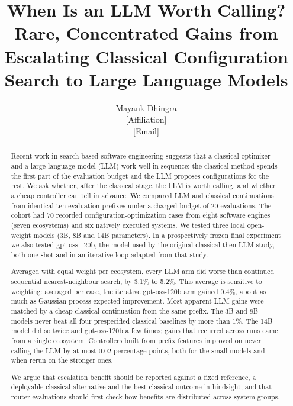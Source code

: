 \newcommand{\RQ}[1]{\textbf{RQ#1}}

\title{When Is an LLM Worth Calling?\\[4pt]
\large Rare, Concentrated Gains from Escalating Classical Configuration Search to Large Language Models}

\author{Mayank Dhingra\\
\small [Affiliation]\\
\small [Email]}

\date{}


\maketitle

\begin{abstract}
Recent work in search-based software engineering suggests that a classical optimizer and a large language model (LLM) work well in sequence: the classical method spends the first part of the evaluation budget and the LLM proposes configurations for the rest. We ask whether, after the classical stage, the LLM is worth calling, and whether a cheap controller can tell in advance. We compared LLM and classical continuations from identical ten-evaluation prefixes under a charged budget of 20 evaluations. The cohort had 70 recorded configuration-optimization cases from eight software engines (seven ecosystems) and six natively executed systems. We tested three local open-weight models (3B, 8B and 14B parameters). In a prospectively frozen final experiment we also tested gpt-oss-120b, the model used by the original classical-then-LLM study, both one-shot and in an iterative loop adapted from that study.

Averaged with equal weight per ecosystem, every LLM arm did worse than continued sequential nearest-neighbour search, by 3.1\% to 5.2\%. This average is sensitive to weighting: averaged per case, the iterative gpt-oss-120b arm gained 0.4\%, about as much as Gaussian-process expected improvement. Most apparent LLM gains were matched by a cheap classical continuation from the same prefix. The 3B and 8B models never beat all four prespecified classical baselines by more than 1\%. The 14B model did so twice and gpt-oss-120b a few times; gains that recurred across runs came from a single ecosystem. Controllers built from prefix features improved on never calling the LLM by at most 0.02 percentage points, both for the small models and when rerun on the stronger ones.

We argue that escalation benefit should be reported against a fixed reference, a deployable classical alternative and the best classical outcome in hindsight, and that router evaluations should first check how benefits are distributed across system groups.
\end{abstract}

